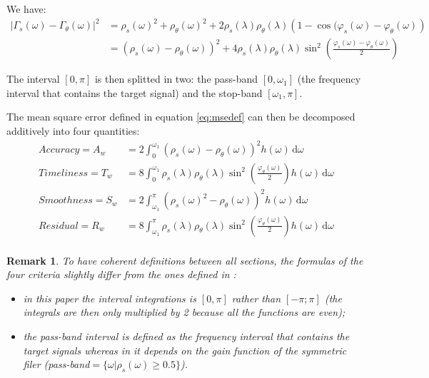 \documentclass[
  12pt,
  ,
  a4paper]{article}
\newcommand\1{\mathds{1}}
\newcommand\ud{\,\mathrm{d}}
\newtheorem*{remarque}{Remark}
\begin{document}
We have:
\begin{align}
\left|\Gamma_s(\omega)-\Gamma_\theta(\omega)\right|^{2} & =\rho_s(\omega)^{2}+\rho_\theta(\omega)^{2}+2\rho_s(\lambda)\rho_\theta(\lambda)\left(1-\cos(\varphi_s(\omega)-\varphi_\theta(\omega)\right) \nonumber\\
 & =\left(\rho_s(\omega)-\rho_\theta(\omega)\right)^{2}+4\rho_s(\lambda)\rho_\theta(\lambda)\sin^{2}\left(\frac{\varphi_s(\omega)-\varphi_\theta(\omega)}{2}\right)
 \label{eq:msedecomp}
\end{align}

The interval \([0,\pi]\) is then splitted in two: the pass-band \([0,\omega_1]\) (the frequency interval that contains the target signal) and the stop-band \([\omega_1,\pi]\).

The mean square error defined in equation \eqref{eq:msedef} can then be decomposed additively into four quantities:
\begin{align*}
Accuracy =A_w&= 2\int_0^{\omega_1}\left(\rho_s(\omega)-\rho_\theta(\omega)\right)^{2}h(\omega)\ud\omega\\
Timeliness =T_w&= 8\int_0^{\omega_1}\rho_s(\lambda)\rho_\theta(\lambda)\sin^{2}\left(\frac{\varphi_\theta(\omega)}{2}\right)h(\omega)\ud\omega\\
Smoothness =S_w&= 2\int_{\omega_1}^\pi\left(\rho_s(\omega)^{2}-\rho_\theta(\omega)\right)^{2}h(\omega)\ud\omega\\
Residual =R_w&= 8\int_{\omega_1}^\pi\rho_s(\lambda)\rho_\theta(\lambda)\sin^{2}\left(\frac{\varphi_\theta(\omega)}{2}\right)h(\omega)\ud\omega\\
\end{align*}

\begin{remarque}

To have coherent definitions between all sections, the formulas of the four criteria slightly differ from the ones defined in \textcite{trilemmaWMR2019}:

\begin{itemize}
\item
  in this paper the interval integrations is \([0,\pi]\) rather than \([-\pi;\pi]\) (the integrals are then only multiplied by 2 because all the functions are even);
\item
  the pass-band interval is defined as the frequency interval that contains the target signals whereas in \textcite{trilemmaWMR2019} it depends on the gain function of the symmetric filer (pass-band\(=\{\omega |\rho_s(\omega)\geq 0.5\}\)).
\end{itemize}

\end{remarque}
\end{document}
